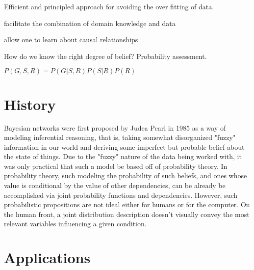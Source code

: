 \documentclass{article}
\begin{document}
Efficient and principled approach for avoiding the over fitting of data.

facilitate the combination of domain knowledge and data

allow one to learn about causal relationships

How do we know the right degree of belief? Probability assessment.

$P(G,S,R)=P(G|S,R)P(S|R)P(R)$

\section{History}

Bayesian networks were first proposed by Judea Pearl in 1985 as a way of modeling inferential reasoning, that is, taking somewhat disorganized "fuzzy" information in our world and deriving some imperfect but probable belief about the state of things. Due to the "fuzzy" nature of the data being worked with, it was only practical that such a model be based off of probability theory. In probability theory, such modeling the probability of such beliefs, and ones whose value is conditional by the value of other dependencies, can be already be accomplished via joint probability functions and dependencies. However, such probabilistic propositions are not ideal either for humans or for the computer. On the human front, a joint distribution description doesn't visually convey the most relevant variables influencing a given condition. 

\cite{murphy02}

\section{Applications}



\end{document}
